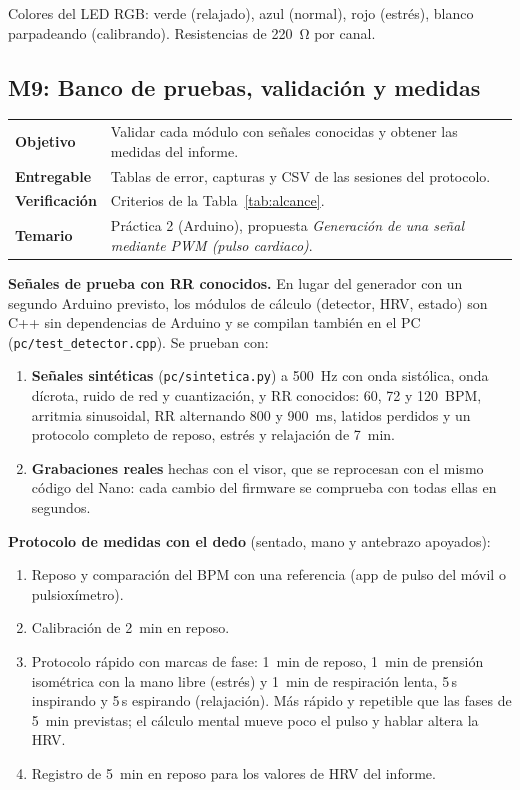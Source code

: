 \documentclass[11pt,a4paper]{article}
\newcommand{\modinfo}[4]{%
  \begin{center}\small
  \renewcommand{\arraystretch}{1.25}
  \begin{tabularx}{\textwidth}{>{\bfseries\color{navy}}lX}
  \toprule
  Objetivo     & #1 \\
  Entregable   & #2 \\
  Verificación & #3 \\
  Temario      & #4 \\
  \bottomrule
  \end{tabularx}
  \end{center}}
\begin{document}
Colores del LED RGB: verde (relajado), azul (normal), rojo (estrés), blanco parpadeando
(calibrando). Resistencias de \qty{220}{\ohm} por canal.

\subsection{M9: Banco de pruebas, validación y medidas}

\modinfo{Validar cada módulo con señales conocidas y obtener las medidas del informe.}
{Tablas de error, capturas y CSV de las sesiones del protocolo.}
{Criterios de la Tabla~\ref{tab:alcance}.}
{Práctica 2 (Arduino), propuesta \emph{Generación de una señal mediante PWM (pulso cardiaco)}.}

\textbf{Señales de prueba con RR conocidos.} En lugar del generador con un segundo Arduino
previsto, los módulos de cálculo (detector, HRV, estado) son C++ sin dependencias de Arduino y
se compilan también en el PC (\texttt{pc/test\_detector.cpp}). Se prueban con:
\begin{enumerate}[leftmargin=1.4em,itemsep=2pt,topsep=2pt]
  \item \textbf{Señales sintéticas} (\texttt{pc/sintetica.py}) a \qty{500}{Hz} con onda
        sistólica, onda dícrota, ruido de red y cuantización, y RR conocidos: 60, 72 y
        \qty{120}{BPM}, arritmia sinusoidal, RR alternando 800 y \qty{900}{ms}, latidos
        perdidos y un protocolo completo de reposo, estrés y relajación de \qty{7}{min}.
  \item \textbf{Grabaciones reales} hechas con el visor, que se reprocesan con el mismo código
        del Nano: cada cambio del firmware se comprueba con todas ellas en segundos.
\end{enumerate}

\textbf{Protocolo de medidas con el dedo} (sentado, mano y antebrazo apoyados):
\begin{enumerate}[leftmargin=1.4em,itemsep=2pt,topsep=2pt]
  \item Reposo y comparación del BPM con una referencia (app de pulso del móvil o
        pulsioxímetro).
  \item Calibración de \qty{2}{min} en reposo.
  \item Protocolo rápido con marcas de fase: \qty{1}{min} de reposo, \qty{1}{min} de prensión
        isométrica con la mano libre (estrés) y \qty{1}{min} de respiración lenta, 5\,s
        inspirando y 5\,s espirando (relajación). Más rápido y repetible que las fases de
        \qty{5}{min} previstas; el cálculo mental mueve poco el pulso y hablar altera la HRV.
  \item Registro de \qty{5}{min} en reposo para los valores de HRV del informe.
\end{enumerate}
\end{document}

